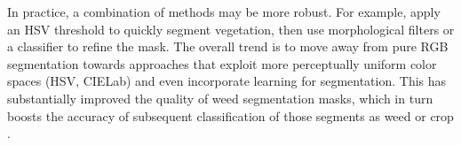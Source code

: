 \documentclass[letterpaper]{report}
\begin{document}
%
In practice, a combination of methods may be more robust. For example, apply an HSV threshold to quickly segment vegetation, then use morphological filters or a classifier to refine the mask. The overall trend  is to move away from pure RGB segmentation towards approaches that exploit more perceptually uniform color spaces (HSV, CIELab) and even incorporate learning for segmentation. This has substantially improved the quality of weed segmentation masks, which in turn boosts the accuracy of subsequent classification of those segments as weed or crop  \parencite{Wu2021-gt}.
%
\end{document}
